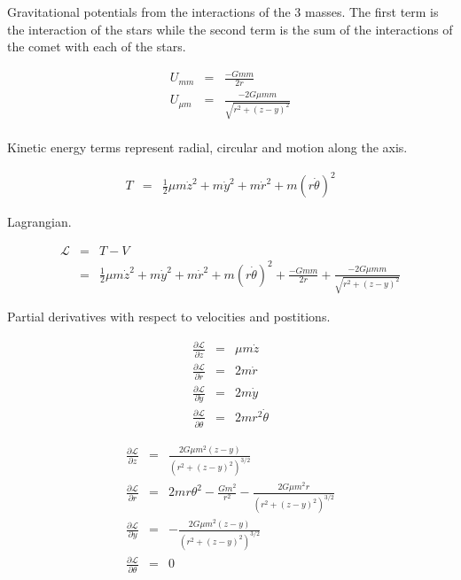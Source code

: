\documentclass{article}
\begin{document}
Gravitational potentials from the interactions of the 3 masses. The first term is the interaction of the
stars while the second term is the sum of the interactions of the comet with each of the stars.

\begin{eqnarray}
U_{m m} & = & \frac{-Gmm}{2r} \\
U_{\mu m} & = & \frac{-2G\mu mm}{\sqrt{r^2 + (z-y)^2}} \\
\label{eq:potentials}
\end{eqnarray}

Kinetic energy terms represent radial, circular and motion along the axis.

\begin{eqnarray}
T & = & \frac{1}{2} \mu m \dot{z}^2 + m \dot{y}^2 + m \dot{r}^2 + m(r\dot{\theta})^2
\label{eq:potentials}
\end{eqnarray}

Lagrangian.

\begin{eqnarray}
\mathcal{L} & = & T - V \\
& = & \frac{1}{2} \mu m \dot{z}^2 + m \dot{y}^2 + m \dot{r}^2 + m(r\dot{\theta})^2 + \frac{-Gmm}{2r} +  \frac{-2G\mu mm}{\sqrt{r^2 + (z-y)^2}}
\label{eq:potentials}
\end{eqnarray}

Partial derivatives with respect to velocities and postitions.

\begin{eqnarray}
\frac{\partial{\mathcal{L}}}{\partial{ \dot{z}}} & = & \mu m \dot{z} \\
\frac{\partial{\mathcal{L}}}{\partial{ \dot{r}}} & = & 2m\dot{r} \\
\frac{\partial{\mathcal{L}}}{\partial{ \dot{y}}} & = & 2m\dot{y} \\
\frac{\partial{\mathcal{L}}}{\partial{ \dot{\theta}}} & = & 2mr^2\dot{\theta} 
\end{eqnarray}

\begin{eqnarray}
\frac{\partial{\mathcal{L}}}{\partial{z}} & = & \frac{2G \mu m^2 (z-y)}{(r^2 + (z-y)^2)^{3/2}} \\
\frac{\partial{\mathcal{L}}}{\partial{r}} & = & 2mr\theta^2 - \frac{G m^2}{r^2} - \frac{2 G \mu m^2 r}{(r^2 + (z-y)^2)^{3/2}} \\
\frac{\partial{\mathcal{L}}}{\partial{y}} & = & - \frac{2G \mu m^2 (z-y)}{(r^2 + (z-y)^2)^{3/2}} \\
\frac{\partial{\mathcal{L}}}{\partial{\theta}} & = & 0 
\end{eqnarray}
\end{document}
